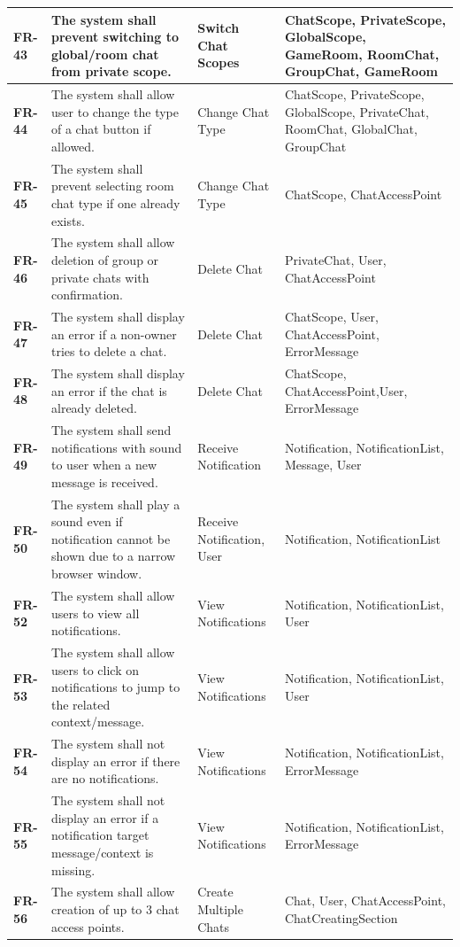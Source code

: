 \documentclass[]{VUMIFTemplateClass}
\begin{document}
\begin{longtable}{|p{3cm}|p{5.5cm}|l|p{4cm}|}
\hline
\textbf{FR-43} & The system shall prevent switching to global/room chat from private scope. & Switch Chat Scopes & ChatScope,  PrivateScope, GlobalScope, GameRoom, RoomChat, GroupChat, GameRoom \\
\hline
\textbf{FR-44} & The system shall allow user to change the type of a chat button if allowed. & Change Chat Type & ChatScope, PrivateScope, GlobalScope, PrivateChat, RoomChat, GlobalChat, GroupChat\\
\hline
\textbf{FR-45} & The system shall prevent selecting room chat type if one already exists. & Change Chat Type & ChatScope, ChatAccessPoint \\
\hline
\textbf{FR-46} & The system shall allow deletion of group or private chats with confirmation. & Delete Chat & PrivateChat, User, ChatAccessPoint \\
\hline
\textbf{FR-47} & The system shall display an error if a non-owner tries to delete a chat. & Delete Chat & ChatScope, User, ChatAccessPoint, ErrorMessage \\
\hline
\textbf{FR-48} & The system shall display an error if the chat is already deleted. & Delete Chat & ChatScope, ChatAccessPoint,User, ErrorMessage \\
\hline
\textbf{FR-49} & The system shall send notifications with sound to user when a new message is received. & Receive Notification & Notification, NotificationList, Message, User \\
\hline
\textbf{FR-50} & The system shall play a sound even if notification cannot be shown due to a narrow browser window. & Receive Notification, User & Notification, NotificationList \\
\hline
\textbf{FR-52} & The system shall allow users to view all notifications. & View Notifications & Notification, NotificationList, User \\
\hline
\textbf{FR-53} & The system shall allow users to click on notifications to jump to the related context/message. & View Notifications & Notification, NotificationList, User \\
\hline
\textbf{FR-54} & The system shall not display an error if there are no notifications. & View Notifications & Notification, NotificationList, ErrorMessage \\
\hline
\textbf{FR-55} & The system shall not display an error if a notification target message/context is missing. & View Notifications & Notification, NotificationList, ErrorMessage \\
\hline
\textbf{FR-56} & The system shall allow creation of up to 3 chat access points. & Create Multiple Chats & Chat, User, ChatAccessPoint, ChatCreatingSection \\

\end{longtable}
\end{document}
